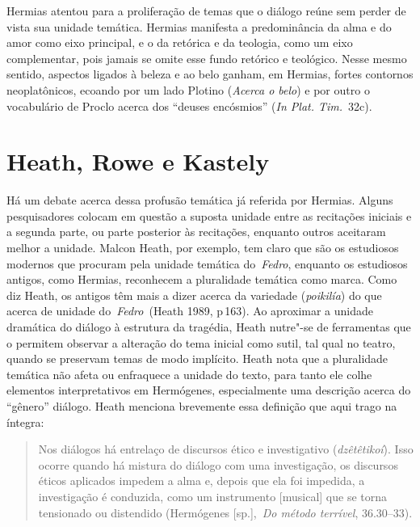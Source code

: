 Hermias atentou para a proliferação de temas que o diálogo reúne sem
perder de vista sua unidade temática. Hermias manifesta a predominância
da alma e do amor como eixo principal, e o da retórica e da teologia,
como um eixo complementar, pois jamais se omite esse fundo retórico e
teológico. Nesse mesmo sentido, aspectos ligados à beleza e ao belo
ganham, em Hermias, fortes contornos neoplatônicos, ecoando por um lado
Plotino (\emph{Acerca o belo}) e por outro o vocabulário de Proclo
acerca dos ``deuses encósmios'' (\emph{In Plat. Tim.}~32c).

 

\section{Heath, Rowe e Kastely}

 

Há um debate acerca dessa profusão temática já referida por Hermias.
Alguns pesquisadores colocam em questão a suposta unidade entre as
recitações iniciais e a segunda parte, ou parte posterior às recitações,
enquanto outros aceitaram melhor a unidade. Malcon Heath, por exemplo,
tem claro que são os estudiosos modernos que procuram pela unidade
temática do~\emph{Fedro}, enquanto os estudiosos antigos, como Hermias,
reconhecem a pluralidade temática como marca. Como diz Heath, os antigos
têm mais a dizer acerca da variedade (\emph{poikilía}) do que acerca de
unidade do~\emph{Fedro~}(Heath 1989, p\,163). Ao aproximar a unidade
dramática do diálogo à estrutura da tragédia, Heath nutre"-se de
ferramentas que o permitem observar a alteração do tema inicial como
sutil, tal qual no teatro, quando se preservam temas de modo implícito.
Heath nota que a pluralidade temática não afeta ou enfraquece a unidade
do texto, para tanto ele colhe elementos interpretativos em Hermógenes,
especialmente uma descrição acerca do ``gênero'' diálogo. Heath menciona
brevemente essa definição que aqui trago na íntegra:

 

\begin{quote}
Nos diálogos há entrelaço de discursos ético e investigativo
(\emph{dzêtêtikoí}). Isso ocorre quando há mistura do diálogo com uma
investigação, os discursos éticos aplicados impedem a alma e, depois que
ela foi impedida, a investigação é conduzida, como um instrumento
[musical] que se torna tensionado ou distendido (Hermógenes
[sp.],~\emph{Do método terrível}, 36.30--33).
\end{quote}

